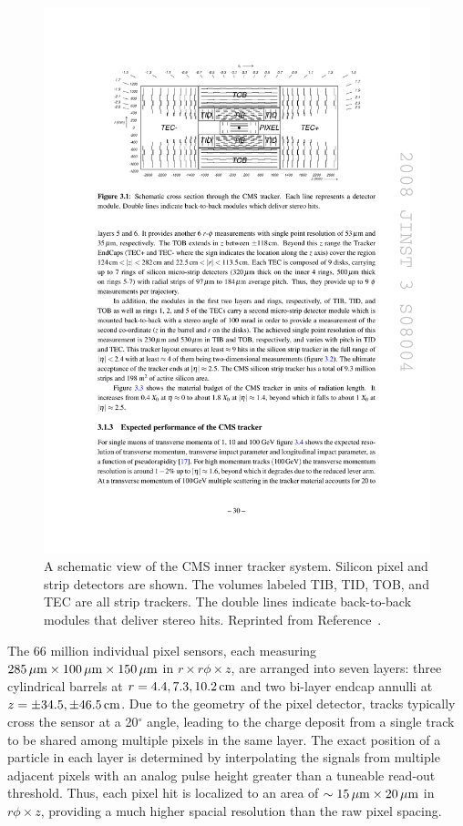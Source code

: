 \begin{figure}[htbp]
  \centering
  \includegraphics[width=\textwidth]{Detector/Figures/cms_tracker.pdf}
  \caption{
    A schematic view of the CMS inner tracker system.
    Silicon pixel and strip detectors are shown.
    The volumes labeled TIB, TID, TOB, and TEC are all strip trackers.
    The double lines indicate back-to-back modules that deliver stereo hits.
    Reprinted from Reference~\cite{}. %
  }
  \label{fig:cms_tracker}
\end{figure}

The 66 million individual pixel sensors, each measuring $285\,\mu\text{m}\times 100\,\mu\text{m}\times 150\,\mu\text{m}$ in $r\times r\phi \times z$, are arranged into seven layers: three cylindrical barrels at $r = 4.4, 7.3, 10.2\,\text{cm}$ and two bi-layer endcap annulli at $z = \pm34.5, \pm46.5 \,\text{cm}$.
Due to the geometry of the pixel detector, tracks typically cross the sensor at a 20$^\circ$ angle, leading to the charge deposit from a single track to be shared among multiple pixels in the same layer.
The exact position of a particle in each layer is determined by interpolating the signals from multiple adjacent pixels with an analog pulse height greater than a tuneable read-out threshold.
Thus, each pixel hit is localized to an area of $\sim 15 \,\mu\text{m}\times 20\,\mu\text{m}$ in $r\phi \times z$, providing a much higher spacial resolution than the raw pixel spacing.

